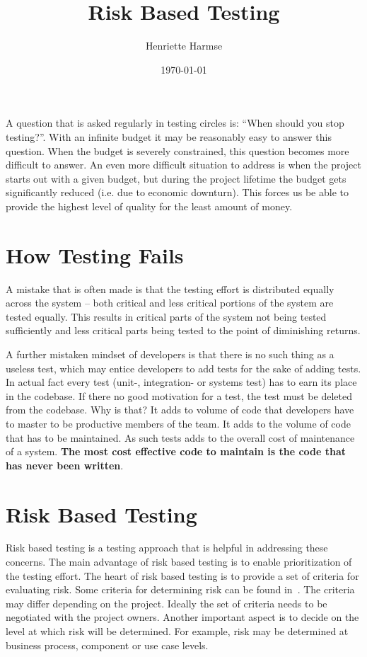 \documentclass{amsart}
\title{Risk Based Testing}
\author{Henriette Harmse}
\date{\today}
\begin{document}
  \maketitle

  A question that is asked regularly in testing circles is: ``When should you stop testing?''. With an infinite budget it may be reasonably easy to answer this question. When the budget is severely constrained, this question becomes more difficult to answer. An even more difficult situation to
address is when the project starts out with a given budget, but during the project lifetime the budget
gets significantly reduced (i.e. due to economic downturn). This forces us be able to provide the
highest level of quality for the least amount of money.

\section{How Testing Fails}
A mistake that is often made is that the testing effort is distributed equally across the system – both
critical and less critical portions of the system are tested equally. This results in critical parts of the
system not being tested sufficiently and less critical parts being tested to the point of diminishing
returns. 

A further mistaken mindset of developers is that there is no such thing as a useless test, which may entice developers to add tests for the sake of adding tests. In actual fact every test (unit-, integration- or systems test) has to earn its place in the codebase. If there no good motivation for a test, the test must be deleted from the codebase. Why is that? It adds to volume of code that developers have to master to be productive members of the team. It adds to the volume of code that has to be maintained. As such tests adds to the overall cost of maintenance of a system. \textbf{The most cost effective code to maintain is the code that has never been written}. 


\section{Risk Based Testing}
Risk based testing is a testing approach that is helpful in addressing these concerns. The main
advantage of risk based testing is to enable prioritization of the testing effort. The heart of risk based
testing is to provide a set of criteria for evaluating risk. Some criteria for determining risk can be
found in~\cite{Naik2008}. The criteria may differ depending on the project. Ideally the set of criteria needs to be
negotiated with the project owners. Another important aspect is to decide on the level at which risk
will be determined. For example, risk may be determined at business process, component or use
case levels.
\end{document}

